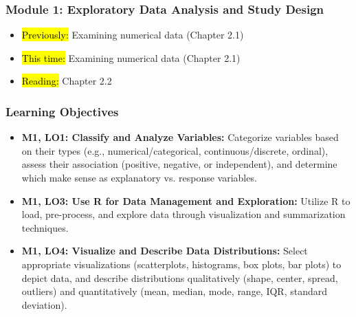 
\begin{frame}
    \frametitle{Module 1: Exploratory Data Analysis and Study Design}
    \begin{itemize}
        \item \hl{Previously: }Examining numerical data (Chapter 2.1)
        \item \hl{This time: }Examining numerical data (Chapter 2.1)
        \item \hl{Reading: }Chapter 2.2
    \end{itemize}

\end{frame}
\begin{frame}
    \frametitle{Learning Objectives}
    \begin{itemize}
        \item \textbf{M1, LO1: Classify and Analyze Variables:} Categorize variables based on their types (e.g., numerical/categorical, continuous/discrete, ordinal), assess their association (positive, negative, or independent), and determine which make sense as explanatory vs. response variables.
        \item \textbf{M1, LO3: Use R for Data Management and Exploration:} Utilize R to load, pre-process, and explore data through visualization and summarization techniques.
        \item \textbf{M1, LO4: Visualize and Describe Data Distributions:} Select appropriate visualizations (scatterplots, histograms, box plots, bar plots) to depict data, and describe distributions qualitatively (shape, center, spread, outliers) and quantitatively (mean, median, mode, range, IQR, standard deviation).
    \end{itemize}
\end{frame}
